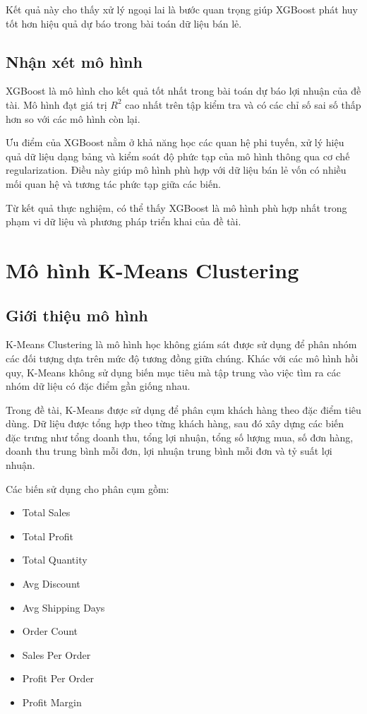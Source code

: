 Kết quả này cho thấy xử lý ngoại lai là bước quan trọng giúp XGBoost phát huy tốt hơn hiệu quả dự báo trong bài toán dữ liệu bán lẻ.

\subsection*{\thesubsection\quad Nhận xét mô hình}

XGBoost là mô hình cho kết quả tốt nhất trong bài toán dự báo lợi nhuận của đề tài. Mô hình đạt giá trị \(R^2\) cao nhất trên tập kiểm tra và có các chỉ số sai số thấp hơn so với các mô hình còn lại.

Ưu điểm của XGBoost nằm ở khả năng học các quan hệ phi tuyến, xử lý hiệu quả dữ liệu dạng bảng và kiểm soát độ phức tạp của mô hình thông qua cơ chế regularization. Điều này giúp mô hình phù hợp với dữ liệu bán lẻ vốn có nhiều mối quan hệ và tương tác phức tạp giữa các biến.

Từ kết quả thực nghiệm, có thể thấy XGBoost là mô hình phù hợp nhất trong phạm vi dữ liệu và phương pháp triển khai của đề tài.


\section{Mô hình K-Means Clustering}

\subsection*{\thesubsection\quad Giới thiệu mô hình}

K-Means Clustering là mô hình học không giám sát được sử dụng để phân nhóm các đối tượng dựa trên mức độ tương đồng giữa chúng. Khác với các mô hình hồi quy, K-Means không sử dụng biến mục tiêu mà tập trung vào việc tìm ra các nhóm dữ liệu có đặc điểm gần giống nhau.

Trong đề tài, K-Means được sử dụng để phân cụm khách hàng theo đặc điểm tiêu dùng. Dữ liệu được tổng hợp theo từng khách hàng, sau đó xây dựng các biến đặc trưng như tổng doanh thu, tổng lợi nhuận, tổng số lượng mua, số đơn hàng, doanh thu trung bình mỗi đơn, lợi nhuận trung bình mỗi đơn và tỷ suất lợi nhuận.

Các biến sử dụng cho phân cụm gồm:
\begin{itemize}
    \item Total Sales
    \item Total Profit
    \item Total Quantity
    \item Avg Discount
    \item Avg Shipping Days
    \item Order Count
    \item Sales Per Order
    \item Profit Per Order
    \item Profit Margin
\end{itemize}

